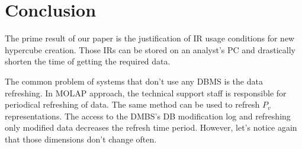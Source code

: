 \documentclass[10pt,journal,cspaper,compsoc]{IEEEtran}
\begin{document}
%





\section{Conclusion}
The prime result of our paper is the justification of IR usage conditions for
new hypercube creation. Those IRs can be stored on an analyst's PC and
drastically shorten the time of getting the required data.

The common problem of systems that don't use any DBMS is the data refreshing. In
MOLAP approach, the technical support staff is responsible for periodical
refreshing of data. The same method can be used to refresh $P_v$
representations. The access to the DMBS's DB modification log and refreshing
only modified data decreases the refresh time period. However, let's notice
again that those dimensions don't change often.
\end{document}

